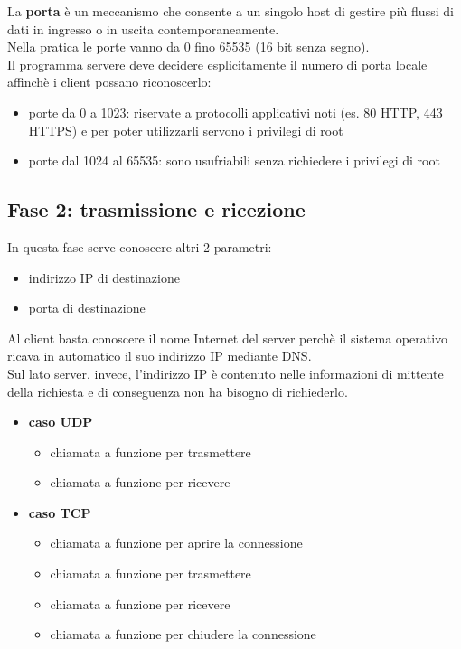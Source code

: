 \documentclass[12pt, a4paper, oneside]{book}
\begin{document}
    La \textbf{porta} è un meccanismo che consente a un singolo host di gestire più flussi di dati in ingresso o in uscita contemporaneamente.\\[0.2ex]
    Nella pratica le porte vanno da 0 fino 65535 (16 bit senza segno).\\[0.2ex]
    Il programma servere deve decidere esplicitamente il numero di porta locale affinchè i client possano riconoscerlo:
    \begin{itemize}[label=$\diamond$]
      \item porte da 0 a 1023: riservate a protocolli applicativi noti (es. 80 HTTP, 443 HTTPS)  e per poter utilizzarli servono i privilegi di root
      \smallskip
      \item porte dal 1024 al 65535: sono usufriabili senza richiedere i privilegi di root
    \end{itemize}

    \subsection{Fase 2: trasmissione e ricezione}
    In questa fase serve conoscere altri 2 parametri:
    \begin{itemize}[label=$\triangleright$]
      \item indirizzo IP di destinazione
      \item porta di destinazione
    \end{itemize}

    Al client basta conoscere il nome Internet del server perchè il sistema operativo ricava in automatico il suo indirizzo IP mediante DNS.\\[0.2ex]
    Sul lato server, invece, l'indirizzo IP è contenuto nelle informazioni di mittente della richiesta e di conseguenza non ha bisogno di richiederlo.

    \begin{itemize}[label=$\Rightarrow$]
      \item \textbf{caso UDP}
      \begin{itemize}[label=$\diamond$]
        \item chiamata a funzione per trasmettere
        \smallskip
        \item chiamata a funzione per ricevere
      \end{itemize}
      \medskip
      \item \textbf{caso TCP}
      \begin{itemize}[label=$\circ$]
        \item chiamata a funzione per aprire la connessione
        \smallskip
        \item chiamata a funzione per trasmettere
        \smallskip
        \item chiamata a funzione per ricevere
        \smallskip
        \item chiamata a funzione per chiudere la connessione
      \end{itemize}
    \end{itemize}
\end{document}

